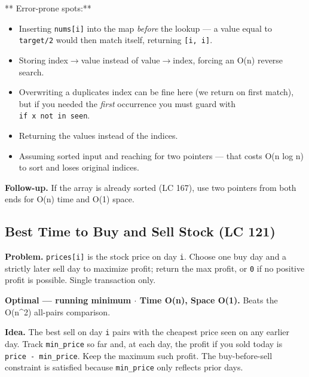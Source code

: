 \documentclass[11pt]{article}
\providecommand{\tightlist}{\setlength{\itemsep}{1pt}\setlength{\parskip}{0pt}}
\begin{document}
** Error-prone spots:**

\begin{itemize}
\tightlist
\item
  Inserting \texttt{nums{[}i{]}} into the map \emph{before} the lookup --- a value equal to \texttt{target/2} would then match itself, returning \texttt{{[}i,\ i{]}}.
\item
  Storing index\(\rightarrow\)value instead of value\(\rightarrow\)index, forcing an O(n) reverse search.
\item
  Overwriting a duplicate\textquotesingle s index can be fine here (we return on first match), but if you needed the \emph{first} occurrence you must guard with \texttt{if\ x\ not\ in\ seen}.
\item
  Returning the values instead of the indices.
\item
  Assuming sorted input and reaching for two pointers --- that costs O(n log n) to sort and loses original indices.
\end{itemize}

\textbf{Follow-up.} If the array is already sorted (LC 167), use two pointers from both ends for O(n) time and O(1) space.

\subsection{Best Time to Buy and Sell Stock (LC 121)}\label{best-time-to-buy-and-sell-stock-lc-121}

\textbf{Problem.} \texttt{prices{[}i{]}} is the stock price on day \texttt{i}. Choose one buy day and a strictly later sell day to maximize profit; return the max profit, or \texttt{0} if no positive profit is possible. Single transaction only.

\textbf{Optimal --- running minimum \(\cdot\) Time O(n), Space O(1).} Beats the O(n\^{}2) all-pairs comparison.

\textbf{Idea.} The best sell on day \texttt{i} pairs with the cheapest price seen on any earlier day. Track \texttt{min\_price} so far and, at each day, the profit if you sold today is \texttt{price\ -\ min\_price}. Keep the maximum such profit. The buy-before-sell constraint is satisfied because \texttt{min\_price} only reflects prior days.

\end{document}

